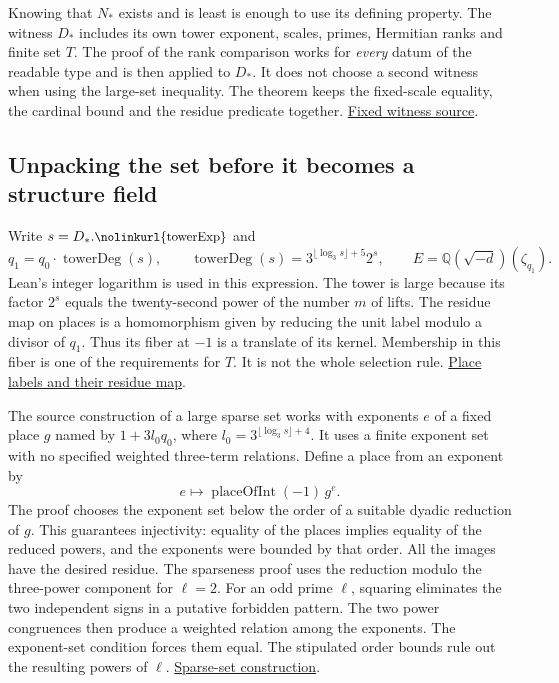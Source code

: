 \documentclass[12pt,letterpaper]{article}
\newcommand{\id}[1]{\ifmmode\text{\small\nolinkurl{#1}}\else{\small\nolinkurl{#1}}\fi}
\newcommand{\prior}[2]{\href{https://github.com/nousentllc/riemann-hypothesis/blob/90e46dd4be3b077bfed33fa64280eb9f306c9d87/research/uriel/experiments/fixed-datum-host-expanded/#1}{#2}}
\newcommand{\readable}[3]{\href{https://github.com/leanprover-community/riemann-hypothesis/blob/e063a923620ee7787b4a1270421478645bf66bdb/src/#1\#L#2}{#3}}
\begin{document}
Knowing that $N_*$ exists and is least is enough to use its defining property. The witness $D_*$ includes its own tower exponent, scales, primes, Hermitian ranks and finite set $T$. The proof of the rank comparison works for \emph{every} datum of the readable type and is then applied to $D_*$. It does not choose a second witness when using the large-set inequality. The theorem \id{actual_selected} keeps the fixed-scale equality, the cardinal bound and the residue predicate together. \prior{ReadableDatum.lean}{Fixed witness source}.

\subsection{Unpacking the set before it becomes a structure field}
Write $s=D_*.\id{towerExp}$ and
\[
 q_1=q_0\cdot\operatorname{towerDeg}(s),\qquad
 \operatorname{towerDeg}(s)=3^{\lfloor\log_3s\rfloor+5}2^s,\qquad
 E=\mathbb Q(\sqrt{-d})(\zeta_{q_1}).
\]
Lean's integer logarithm is used in this expression. The tower is large because its factor $2^s$ equals the twenty-second power of the number $m$ of lifts. The residue map on places is a homomorphism given by reducing the unit label modulo a divisor of $q_1$. Thus its fiber at $-1$ is a translate of its kernel. Membership in this fiber is one of the requirements for $T$. It is not the whole selection rule. \readable{New/Reduction/Data/FieldsAndPlaces.lean}{280}{Place labels and their residue map}.

The source construction of a large sparse set works with exponents $e$ of a fixed place $g$ named by $1+3l_0q_0$, where $l_0=3^{\lfloor\log_3s\rfloor+4}$. It uses a finite exponent set with no specified weighted three-term relations. Define a place from an exponent by
\[
                          e\longmapsto \operatorname{placeOfInt}(-1)\,g^e.
\]
The proof chooses the exponent set below the order of a suitable dyadic reduction of $g$. This guarantees injectivity: equality of the places implies equality of the reduced powers, and the exponents were bounded by that order. All the images have the desired residue. The sparseness proof uses the reduction modulo the three-power component for $\ell=2$. For an odd prime $\ell$, squaring eliminates the two independent signs in a putative forbidden pattern. The two power congruences then produce a weighted relation among the exponents. The exponent-set condition forces them equal. The stipulated order bounds rule out the resulting powers of $\ell$. \readable{New/Reduction/Data/Existence.lean}{167}{Sparse-set construction}.
\end{document}
